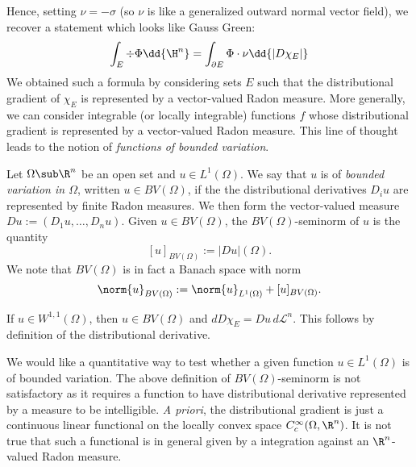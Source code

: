 \documentclass[../main.tex]{subfiles}
\begin{document}
Hence, setting $ \nu = -\sigma $ (so $ \nu $ is like a generalized outward normal vector field), we recover a statement which looks like Gauss Green:
\[
    \int_{E} \div{\Phi} \dd{\H^{n}} = \int_{\partial E} \Phi\cdot \nu\dd{|D \chi_{E}|}
\]
We obtained such a formula by considering sets $ E $ such that the distributional gradient of $ \chi_{E} $  is represented by a vector-valued Radon measure. More generally, we can consider integrable (or locally integrable) functions $ f $ whose distributional gradient is represented by a vector-valued Radon measure. This line of thought leads to the notion of \textit{functions of bounded variation}.

\begin{definition}\label{def:BV}
    Let $ \Omega\sub \R^{n} $ be an open set and $ u\in L^{1}(\Omega) $. We say that $ u $ is of \textit{bounded variation in $\Omega$}, written $ u\in BV(\Omega) $, if the the distributional derivatives $ D_{i}u $ are represented by finite Radon measures. We then form the vector-valued measure $ Du:=(D_{1}u,\ldots, D_{n}u) $. Given $ u\in BV(\Omega) $, the $ BV(\Omega) $-seminorm of $ u $ is the quantity 
    \[
        [u]_{BV(\Omega)} := |Du|(\Omega).
    \]
    We note that $ BV(\Omega) $ is in fact a Banach space with norm 
    \[
        \norm{u}_{BV(\Omega)} := \norm{u}_{L^{1}(\Omega)} + [u]_{BV(\Omega)}.
    \]
\end{definition}

\begin{example}
    If $ u\in W^{1,1}(\Omega) $, then $ u\in BV(\Omega) $ and $ dD \chi_{E} = Du \,d \mathcal{L}^{n} $. This follows by definition of the distributional derivative.
\end{example}

We would like a quantitative way to test whether a given function $ u\in L^{1}(\Omega) $ is of bounded variation. The above definition of $ BV(\Omega) $-seminorm is not satisfactory as it requires a function to have distributional derivative represented by a measure to be intelligible. \textit{A priori}, the distributional gradient is just a continuous linear functional on the locally convex space $ C^{\infty}_{c}(\Omega,\R^{n}) $. It is not true that such a functional is in general given by a integration against an $ \R^{n} $-valued Radon measure.
\end{document}
